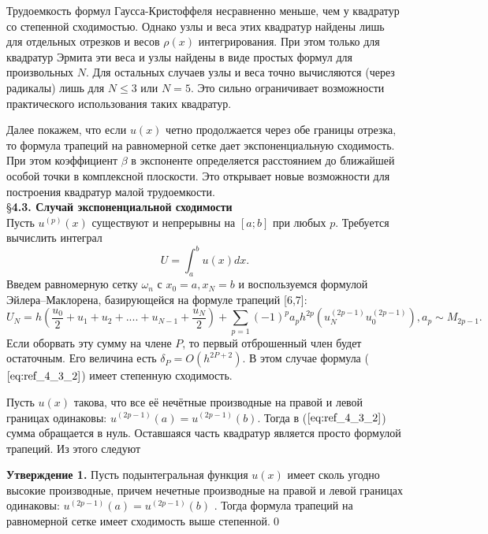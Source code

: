 Трудоемкость формул Гаусса-Кристоффеля несравненно меньше, чем у квадратур со
степенной сходимостью. Однако узлы и веса этих квадратур
найдены лишь для отдельных отрезков и весов $\rho(x)$ интегрирования. При этом
только для квадратур Эрмита эти веса и узлы найдены в виде простых формул
для произвольных $N$. Для остальных случаев узлы и веса точно вычисляются
(через радикалы) лишь для $N \leqslant 3$ или $N = 5$. Это сильно ограничивает
возможности практического использования таких квадратур.

Далее покажем, что если $u(x)$ четно продолжается через обе границы
отрезка, то формула трапеций на равномерной сетке дает экспоненциальную
сходимость. При этом коэффициент $\beta$ в экспоненте определяется расстоянием
до ближайшей особой точки в комплексной плоскости. Это открывает новые
возможности для построения квадратур малой трудоемкости.
\\

\S \textbf{4.3. Случай экспоненциальной сходимости}
\\

Пусть $u^{(p)}(x)$ существуют и непрерывны на $[a;b]$ при любых $p$. Требуется вычислить интеграл
\begin{equation}
U = \int_a^b u(x)dx.
\label{eq:ref_4_3_1}
\end{equation}
Введем равномерную сетку $\omega_n$ с $x_0=a,x_N=b$ и воспользуемся формулой
Эйлера–Маклорена, базирующейся на формуле трапеций [6,7]:
\begin{equation}
U_N=h(\frac{u_0}{2} + u_1 + u_2 + .... + u_{N-1} + \frac{u_N}{2}) + \sum_{p=1} (-1)^p a_p h^{2p}(u_N^{(2p-1)}u_0^{(2p-1)}),
a_p \sim M_{2p-1}.
\label{eq:ref_4_3_2}
\end{equation}
Если оборвать эту сумму на члене $P$, то первый отброшенный член будет
остаточным. Его величина есть $\delta_P=O(h^{2P+2})$. В этом случае формула ($\ref{eq:ref_4_3_2}$) имеет
степенную сходимость.

Пусть $u(x)$ такова, что все её нечётные производные на правой и левой
границах одинаковы: $u^{(2p-1)}(a)=u^{(2p-1)}(b)$. Тогда в ($\ref{eq:ref_4_3_2}$) сумма обращается в
нуль. Оставшаяся часть квадратур является просто формулой трапеций. Из
этого следуют

\textbf{Утверждение 1.} Пусть подынтегральная функция $u(x)$ имеет сколь
угодно высокие производные, причем нечетные производные на правой и левой
границах одинаковы: $u^{(2p-1)}(a)=u^{(2p-1)}(b)$ . Тогда формула трапеций на
равномерной сетке имеет сходимость выше степенной.\qed

